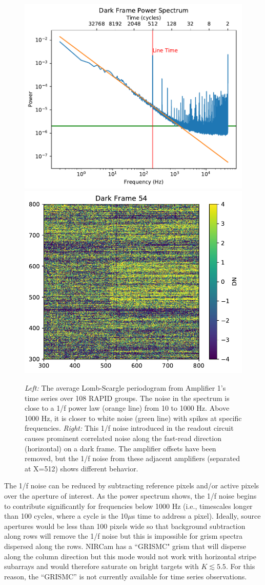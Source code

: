 \documentclass[]{aastex62}
\begin{document}
\begin{figure}[!hbtp]
\centering
\includegraphics[width=.4\columnwidth]{avg_psd_amp_1.pdf}
\includegraphics[width=.4\columnwidth]{preamp_removed_grp_54.pdf}
\caption{{\it Left:} The average Lomb-Scargle periodogram from Amplifier 1's time series over 108 RAPID groups.
The noise in the spectrum is close to a 1/f power law (orange line) from 10 to 1000 Hz.
Above 1000 Hz, it is closer to white noise (green line) with spikes at specific frequencies.
{\it Right:} This 1/f noise introduced in the readout circuit causes prominent correlated noise along the fast-read direction (horizontal) on a dark frame.
The amplifier offsets have been removed, but the 1/f noise from these adjacent amplifiers (separated at X=512) shows different behavior.
}\label{fig:pixelTSeriesPSpec}
\end{figure}

The 1/f noise can be reduced by subtracting reference pixels and/or active pixels over the aperture of interest.
As the power spectrum shows, the 1/f noise begins to contribute significantly for frequencies below 1000 Hz (i.e., timescales longer than 100 cycles, where a cycle is the 10$\mu$s time to address a pixel).
Ideally, source apertures would be less than 100 pixels wide so that background subtraction along rows will remove the 1/f noise but this is impossible for grism spectra dispersed along the rows.
NIRCam has a ``GRISMC" grism that will disperse along the column direction but this mode would not work with horizontal stripe subarrays and would therefore saturate on bright targets with $K \lesssim 5.5$.
For this reason, the ``GRISMC'' is not currently available for time series observations.
\end{document}

